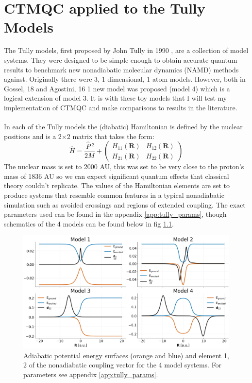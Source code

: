 \chapter{CTMQC applied to the Tully Models}
\label{chap:tully_models}

The Tully models, first proposed by John Tully in 1990 \cite{tully_molecular_1990}, are a collection of model systems. They were designed to be simple enough to obtain accurate quantum results to benchmark new nonadiabatic molecular dynamics (NAMD) methods against. Originally there were 3, 1 dimensional, 1 atom models. However, both in Gossel, 18 \cite{gossel_coupled-trajectory_2018} and Agostini, 16 \cite{agostini_quantum-classical_2016} 1 new model was proposed (model 4) which is a logical extension of model 3. It is with these toy models that I will test my implementation of CTMQC and make comparisons to results in the literature.
\\\\
In each of the Tully models the (diabatic) Hamiltonian is defined by the nuclear positions and is a 2$\times$2 matrix that takes the form:
\[\hat{H} = \frac{\ \hat{P} \ ^2}{2M} + \left(
\begin{array}{cc}
  H_{11}(\mathbf{R}) & H_{12}(\mathbf{R}) \\
  H_{21}(\mathbf{R}) & H_{22}(\mathbf{R})
\end{array} \right)\]
The nuclear mass is set to 2000 AU, this was set to be very close to the proton's mass of 1836 AU so we can expect significant quantum effects that classical theory couldn't replicate. The values of the Hamiltonian elements are set to produce systems that resemble common features in a typical nonadiabatic simulation such as avoided crossings and regions of extended coupling. The exact parameters used can be found in the appendix \ref{app:tully_params}, though schematics of the 4 models can be found below in fig \ref{fig:tully_schematics}.

\begin{figure}[H]
  \includegraphics[width=\textwidth]{Chapter_tullyModels/model_schematics.png}
  \caption{\label{fig:tully_schematics}Adiabatic potential energy surfaces (orange and blue) and element 1, 2 of the nonadiabatic coupling vector for the 4 model systems. For parameters see appendix \ref{app:tully_params}.}
\end{figure}
